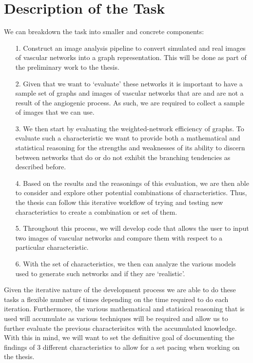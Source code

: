 \documentclass{article}
\begin{document}
\section{Description of the Task}

We can breakdown the task into smaller and concrete components:

\begin{itemize}
    \item[1.] Construct an image analysis pipeline to convert simulated
        and real images of vascular networks into a graph
        representation. This will be done as part of the
        preliminary work to the thesis.
   
    \item[2.] Given that we want to `evaluate' these networks it is important
        to have a sample set of graphs and images of vascular networks that
        are and are not a result of the angiogenic process. As such, we are
        required to collect a sample of images that we can use.

    \item[3.] We then start by evaluating the weighted-network
        efficiency of graphs. To evaluate such a characteristic we want to
        provide both a mathematical and statistical reasoning for
        the strengths and weaknesses of its ability to discern between
        networks that do or do not exhibit the branching tendencies
        as described before.

    \item[4.] Based on the results and the reasonings of this evaluation,
        we are then able to consider and explore other potential combinations
        of characteristics. Thus, the thesis can follow this iterative
        workflow of trying and testing new characteristics to create a
        combination or set of them.

    \item[5.] Throughout this process, we will develop code that allows the
        user to input two images of vascular networks and compare them with
        respect to a particular characteristic.

    \item[6.] With the set of characteristics, we then can analyze the
        various models used to generate such networks and if they are
        `realistic'.

\end{itemize}

Given the iterative nature of the development process we are able to do
these tasks a flexible number of times depending on the time required to
do each iteration. Furthermore, the various mathematical and statisical
reasoning that is used will accumulate as various techniques will be
required and allow us to further evaluate the previous characterisitcs
with the accumulated knowledge. With this in mind, we will want to set the
definitive goal of documenting the findings of 3 different characteristics
to allow for a set pacing when working on the thesis.
\end{document}
